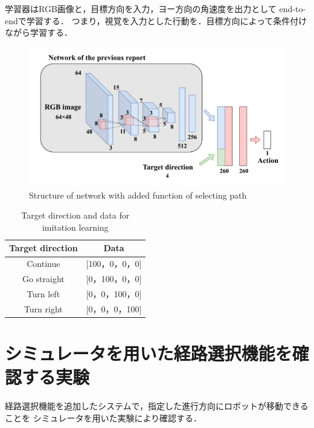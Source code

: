 学習器はRGB画像と，目標方向を入力，ヨー方向の角速度を出力として
end-to-endで学習する．
つまり，視覚を入力とした行動を．目標方向によって条件付けながら学習する．
\begin{figure}[htbp]
    \centering
     \includegraphics[width=130mm]{images/pdf/haru_mech.pdf}
     \caption{Structure of network with added function of
     selecting path}
     \label{fig:haru_mech_net}
\end{figure}

\begin{table}[htbp]
    \centering
    \caption{Target direction and data for imitation learning}\label{tab:target_old}
    \begin{tabular}{|c|c|}
    \hline
    Target direction & Data        \\
    \hline
    Continue   & {[}100，0，0，0{]} \\
    Go straight   & {[}0，100，0，0{]} \\
    Turn left   & {[}0，0，100，0{]} \\
    Turn right   & {[}0，0，0，100{]} \\
    \hline
    \end{tabular}
    \end{table}

\newpage
\section{シミュレータを用いた経路選択機能を確認する実験}
経路選択機能を追加したシステムで，指定した進行方向にロボットが移動できることを
シミュレータを用いた実験により確認する．
